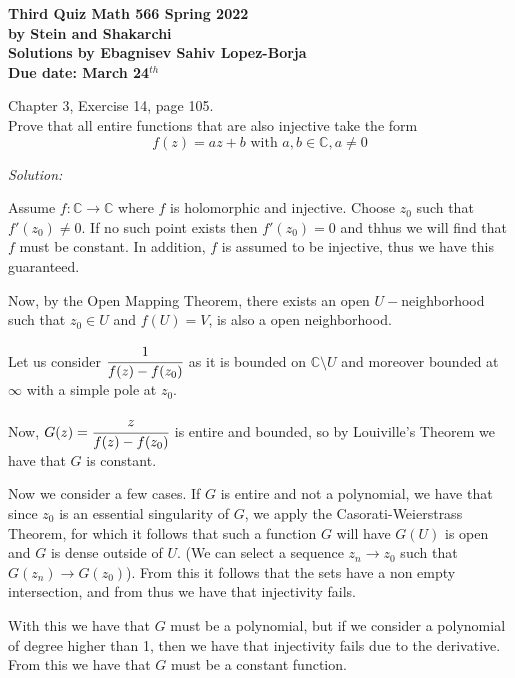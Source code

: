 \documentclass[addpoints,12pt]{exam}
\newcommand{\C}{{\mathbb C}}
\begin{document}
\begin{center}
{\large \bf Third Quiz \hspace*{.3in} Math 566 \hspace*{.3in} 
Spring 2022\\  by Stein and Shakarchi} \vspace*{1cm}\\ \bf Solutions by Ebagnisev Sahiv Lopez-Borja \\
\bf Due date: March 24$^{th}$
\end{center}

\begin{questions}

\question[8]  Chapter 3, Exercise 14, page 105.\\
Prove that all entire functions that are also injective take the form $$f(z)=az+b \mbox{ with } a,b \in \C, a\neq 0$$

\emph{Solution:} 
\vspace{1mm}

Assume  $f:\C \to \C$ where $f$ is holomorphic and injective.  Choose $z_0$ such that $f'(z_0)\neq 0$.  If no such point exists then $f'(z_0) =0$ and thhus we will find that $f$ must be constant.  In addition, $f$ is assumed to be injective, thus we have this guaranteed.

Now, by the Open Mapping Theorem, there exists an open $U-$neighborhood such that $z_0 \in U$ and $f(U)=V$, is also a open neighborhood.

Let us consider $\cfrac{1}{f(z)-f(z_0)}$ as it is bounded on $\C \setminus U$ and moreover bounded at $\infty$ with a simple pole at $z_0$.

Now, $G(z)=\cfrac{z}{f(z)-f(z_0)}$ is entire and bounded, so by Louiville's Theorem we have that $G$ is constant. 

Now we consider a few cases.  If $G$ is entire and not a polynomial, we have that since $z_0$ is an essential singularity of $G$, we apply the Casorati-Weierstrass Theorem, for which it follows that such a function $G$ will have $G(U) $ is open and $G $ is dense outside of $U$.  (We can select a sequence $z_n \to z_0$ such that $G(z_n) \to G(z_0)$).  From this it follows that the sets have a non empty intersection, and from thus we have that injectivity fails.

With this we have that $G$ must be a polynomial, but if we consider a polynomial of degree higher than 1, then we have that injectivity fails due to the derivative.  From this we have that $G$ must be a constant function.


\end{questions}
\end{document}
